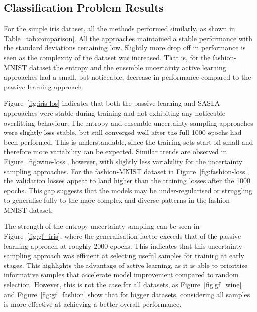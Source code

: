 \documentclass[10pt, conference]{IEEEtran}
\begin{document}
\subsection{Classification Problem Results}

For the simple iris dataset, all the methods performed similarly, as shown in Table~\ref{tab:comparison}. All the approaches maintained a stable performance with the standard deviations remaining low. Slightly more drop off in performance is seen as the complexity of the dataset was increased. That is, for the fashion-MNIST dataset the entropy and the ensemble uncertainty active learning approaches had a small, but noticeable, decrease in performance compared to the passive learning approach.

Figure~\ref{fig:iris-los} indicates that both the passive learning and SASLA approaches were stable during training and not exhibiting any noticeable overfitting behaviour. The entropy and ensemble uncertainty sampling approaches were slightly less stable, but still converged well after the full 1000 epochs had been performed. This is understandable, since the training sets start off small and therefore more variability can be expected. Similar trends are observed in Figure~\ref{fig:wine-loss}, however, with slightly less variability for the uncertainty sampling approaches. For the fashion-MNIST dataset in Figure~\ref{fig:fashion-loss}, the validation losses appear to land higher than the training losses after the 1000 epochs. This gap suggests that the models may be under-regularised or struggling to generalise fully to the more complex and diverse patterns in the fashion-MNIST dataset.

The strength of the entropy uncertainty sampling can be seen in Figure~\ref{fig:gf_iris}, where the generalisation factor exceeds that of the passive learning approach at roughly 2000 epochs. This indicates that this uncertainty sampling approach was efficient at selecting useful samples for training at early stages. This highlights the advantage of active learning, as it is able to prioritise informative samples that accelerate model improvement compared to random selection. However, this is not the case for all datasets, as Figure~\ref{fig:gf_wine} and Figure~\ref{fig:gf_fashion} show that for bigger datasets, considering all samples is more effective at achieving a better overall performance. 
\end{document}
